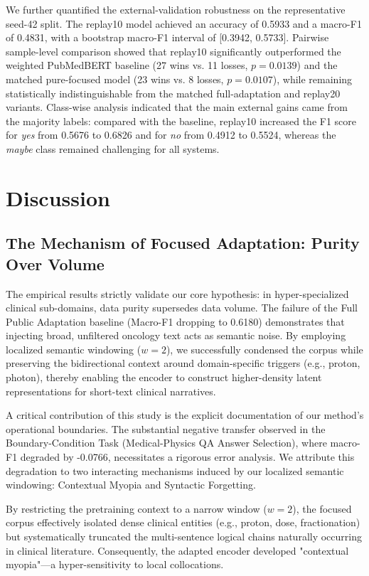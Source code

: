 \documentclass[a4paper,fleqn]{cas-dc}
\begin{document}
We further quantified the external-validation robustness on the representative seed-42 split. The replay10 model achieved an accuracy of 0.5933 and a macro-F1 of 0.4831, with a bootstrap macro-F1 interval of [0.3942, 0.5733]. Pairwise sample-level comparison showed that replay10 significantly outperformed the weighted PubMedBERT baseline (27 wins vs. 11 losses, $p=0.0139$) and the matched pure-focused model (23 wins vs. 8 losses, $p=0.0107$), while remaining statistically indistinguishable from the matched full-adaptation and replay20 variants. Class-wise analysis indicated that the main external gains came from the majority labels: compared with the baseline, replay10 increased the F1 score for \textit{yes} from 0.5676 to 0.6826 and for \textit{no} from 0.4912 to 0.5524, whereas the \textit{maybe} class remained challenging for all systems.






\section{Discussion} \label{Discussion}

\iffalse
\subsection{The Mechanism of Focused Adaptation: Purity Over Volume}
The empirical results strictly validate our core hypothesis: in hyper-specialized clinical sub-domains, data purity supersedes data volume. The failure of the Full Public Adaptation baseline (Macro-F1 dropping to 0.6180) demonstrates that injecting broad, unfiltered oncology text acts as semantic noise. By employing localized semantic windowing ($w=2$), we successfully condensed the corpus while preserving the bidirectional context around domain-specific triggers (e.g., proton, photon), thereby enabling the encoder to construct higher-density latent representations for short-text clinical narratives.

A critical contribution of this study is the explicit documentation of our method's operational boundaries. The substantial negative transfer observed in the Boundary-Condition Task (Medical-Physics QA Answer Selection), where macro-F1 degraded by -0.0766, necessitates a rigorous error analysis. We attribute this degradation to two interacting mechanisms induced by our localized semantic windowing: Contextual Myopia and Syntactic Forgetting.

By restricting the pretraining context to a narrow window ($w=2$), the focused corpus effectively isolated dense clinical entities (e.g., proton, dose, fractionation) but systematically truncated the multi-sentence logical chains naturally occurring in clinical literature. Consequently, the adapted encoder developed "contextual myopia"—a hyper-sensitivity to local collocations.
\end{document}
